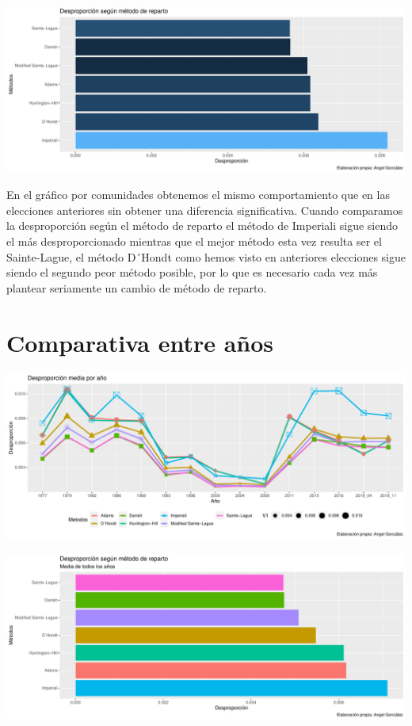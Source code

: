 \documentclass[12pt,a4paper,]{book}
\numberwithin{dummy}{section}
\theoremstyle{ocrenumbox}
\theoremstyle{blacknumex}
\theoremstyle{blacknumbox}
\theoremstyle{ocrenum}
\theoremstyle{ocrenum}
\begin{document}
\begin{center}\includegraphics[width=0.95\linewidth]{figurasR/unnamed-chunk-138-2} \end{center}

En el gráfico por comunidades obtenemos el mismo comportamiento que en
las elecciones anteriores sin obtener una diferencia significativa.
Cuando comparamos la desproporción según el método de reparto el método
de Imperiali sigue siendo el más desproporcionado mientras que el mejor
método esta vez resulta ser el Sainte-Lague, el método D´Hondt como
hemos visto en anteriores elecciones sigue siendo el segundo peor método
posible, por lo que es necesario cada vez más plantear seriamente un
cambio de método de reparto.

\hypertarget{comparativa-entre-auxf1os}{%
\section{Comparativa entre años}\label{comparativa-entre-auxf1os}}

\begin{center}\includegraphics[width=0.95\linewidth]{figurasR/unnamed-chunk-139-1} \end{center}

\begin{center}\includegraphics[width=0.95\linewidth]{figurasR/unnamed-chunk-139-2} \end{center}
\end{document}
